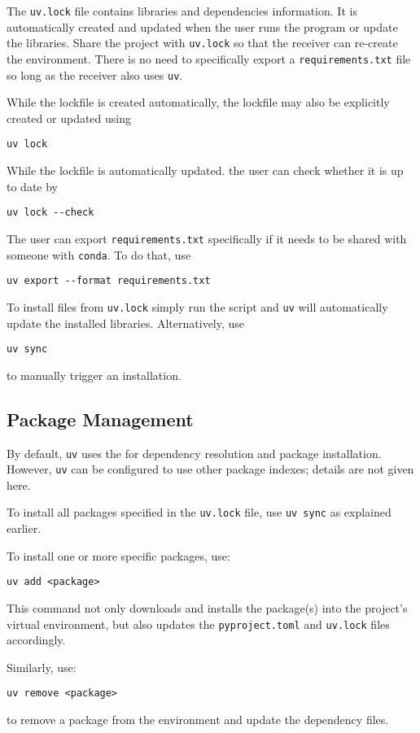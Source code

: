 The \verb|uv.lock| file contains libraries and dependencies information. It is automatically created and updated when the user runs the program or update the libraries. Share the project with \verb|uv.lock| so that the receiver can re-create the environment. There is no need to specifically export a \verb|requirements.txt| file so long as the receiver also uses \verb|uv|.

While the lockfile is created automatically, the lockfile may also be explicitly created or updated using
\begin{lstlisting}
uv lock
\end{lstlisting}
While the lockfile is automatically updated. the user can check whether it is up to date by
\begin{lstlisting}
uv lock --check
\end{lstlisting}
The user can export \verb|requirements.txt| specifically if it needs to be shared with someone with \verb|conda|. To do that, use
\begin{lstlisting}
uv export --format requirements.txt
\end{lstlisting}

To install files from \verb|uv.lock| simply run the script and \verb|uv| will automatically update the installed libraries. Alternatively, use
\begin{lstlisting}
uv sync
\end{lstlisting}
to manually trigger an installation.

\subsection{Package Management}


By default, \verb|uv| uses the  for dependency resolution and package installation. However, \verb|uv| can be configured to use other package indexes; details are not given here.

To install all packages specified in the \verb|uv.lock| file, use \verb|uv sync| as explained earlier.

To install one or more specific packages, use:
\begin{lstlisting}
uv add <package>
\end{lstlisting}
This command not only downloads and installs the package(s) into the project’s virtual environment, but also updates the \verb|pyproject.toml| and \verb|uv.lock| files accordingly.

Similarly, use:
\begin{lstlisting}
uv remove <package>
\end{lstlisting}
to remove a package from the environment and update the dependency files.

